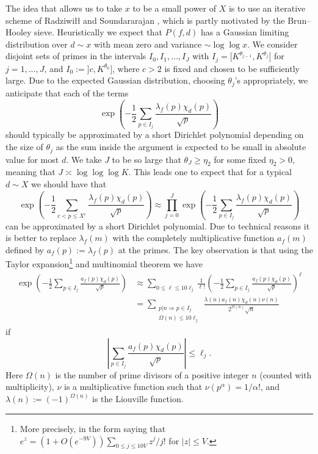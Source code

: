 \documentclass[a4paper,10pt,twoside]{amsart}
\theoremstyle{definition}
\numberwithin{equation}{section}
\newcommand\eps{\varepsilon}
\renewcommand\:{\colon}
\begin{document}
The idea that allows us to take $x$ to be a small power of $X$ is to use an iterative scheme of Radziwi{\l\l} and Soundararajan \cite{Radziwill-Soundararajan2015}, which is partly motivated by the Brun--Hooley sieve. Heuristically we expect that $P(f,d)$ has a Gaussian limiting distribution over $d\sim x$ with mean zero and variance $\sim\log\log x$. We consider disjoint sets of primes in the intervals $I_0,I_1,...,I_J$ with $I_j=[K^{\theta_{j-1}},K^{\theta_j}[$ for $j=1,...,J$, and $I_0:=]c,K^{\theta_0}]$, where $c>2$ is fixed and chosen to be sufficiently large. Due to the expected Gaussian distribution, choosing $\theta_j$'s appropriately, we anticipate that each of the terms
\[ 
\exp\left(-\frac12\sum_{p\in I_j}\frac{\lambda_f(p)\chi_d(p)}{\sqrt p}\right)
\]
should typically be approximated by a short Dirichlet polynomial depending on the size of $\theta_j$ as the sum inside the argument is expected to be small in absolute value for most $d$. We take $J$ to be so large that $\theta_J\geq\eta_2$ for some fixed $\eta_2>0$, meaning that $J\asymp\log\log\log K$. This leads one to expect that for a typical $d\sim X$ we should have that
\[ 
\exp\left(-\frac12\sum_{c<p\leq X^\eps}\frac{\lambda_f(p)\chi_d(p)}{\sqrt p}\right)\approx\prod_{j=0}^J\exp\left(-\frac12\sum_{p\in I_j}\frac{\lambda_f(p)\chi_d(p)}{\sqrt p}\right)
\] 
can be approximated by a short Dirichlet polynomial. Due to technical reasons it is better to replace $\lambda_f(m)$ with the completely multiplicative function $a_f(m)$ defined by $a_f(p):=\lambda_f(p)$ at the primes. The key observation is that using the Taylor expansion\footnote{More precisely, in the form saying that $e^z=(1+O(e^{-9V}))\sum_{0\leq j\leq 10V}z^j/j!$ for $|z|\leq V$.} and multinomial theorem we have
\begin{align*}
\exp\left(-\frac12\sum_{p\in I_j}\frac{a_f(p)\chi_d(p)}{\sqrt p}\right)&\approx \sum_{0\leq \ell\leq 10\ell_j}\frac1{\ell!}\left(-\frac12\sum_{p\in I_j}\frac{a_f(p)\chi_d(p)}{\sqrt p}\right)^\ell\\
&=\sum_{\substack{p|n\Rightarrow p\in I_j\\
\Omega(n)\leq 10\ell_j}}\frac{\lambda(n)a_f(n)\chi_d(n)\nu(n)}{2^{\Omega(n)}\sqrt n}
\end{align*}
if 
\[ 
\left|\sum_{p\in I_j}\frac{a_f(p)\chi_d(p)}{\sqrt p}\right|\leq\ell_j.
\]
Here $\Omega(n)$ is the number of prime divisors of a positive integer $n$ (counted with multiplicity), $\nu$ is a multiplicative function such that $\nu(p^\alpha)=1/\alpha !$, and $\lambda(n):=(-1)^{\Omega(n)}$ is the Liouville function.
\end{document}

